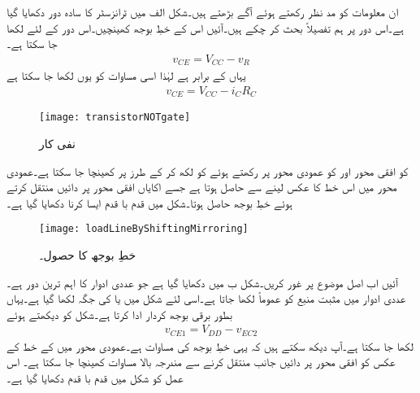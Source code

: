 ان معلومات کو مد نظر رکھتے ہوئے آگے بڑھتے ہیں۔شکل  الف میں ٹرانزسٹر کا سادہ دور دکھایا گیا ہے۔اس دور پر ہم تفصیلاً بحث کر چکے ہیں۔آئیں اس کے خطِ بوجھ کھینچیں۔اس دور کے لئے لکھا جا سکتا ہے۔
\begin{align*}
v_{CE}=V_{CC}-v_R
\end{align*}
یہاں  کے برابر ہے لہٰذا اسی مساوات کو یوں لکھا جا سکتا ہے
 \begin{align*}
v_{CE}=V_{CC}-i_C R_C
\end{align*}
%
\begin{figure}
\centering
\texttt{[image: transistorNOTgate]}
\caption{نفی کار}
\label{شکل_ٹرانزسٹر_نفی_کار}
\end{figure}
 کو افقی محور اور  کو عمودی محور پر رکھتے  ہوئے   کو  لکھ کر  کے طرز پر کھینچا جا سکتا ہے۔عمودی محور میں اس خط کا عکس لینے سے  حاصل ہوتا ہے جسے  اکایاں افقی محور پر دائیں منتقل کرتے ہوئے خطِ بوجھ  حاصل ہوتا۔شکل  میں قدم با قدم ایسا کرنا دکھایا گیا ہے۔
\begin{figure}
\centering
\texttt{[image: loadLineByShiftingMirroring]}
\caption{خطِ بوجھ کا حصول۔}
\label{شکل_ٹرانزسٹر_برقی_بار_کے_حصول_کا_دوسرا_طریقہ}
\end{figure}

آئیں اب اصل موضوع پر غور کریں۔شکل  ب میں   دکھایا گیا ہے جو عددی ادوار کا اہم ترین دور ہے۔عددی ادوار میں مثبت منبع کو  عموماً  لکھا جاتا ہے۔اسی لئے شکل میں  یا  کی جگہ  لکھا گیا ہے۔یہاں  بطور برقی بوجھ کردار ادا کرتا ہے۔شکل کو دیکھتے ہوئے
\begin{align*}
v_{CE1}=V_{DD}-v_{EC2}
\end{align*}
لکھا جا سکتا ہے۔آپ دیکھ سکتے ہیں کہ یہی  خطِ بوجھ  کی مساوات ہے۔عمودی محور میں  کے  خط کے عکس کو افقی محور پر دائیں جانب  منتقل کرنے سے مندرجہ بالا مساوات کھینچا جا سکتا ہے۔ اس عمل کو شکل  میں قدم با قدم دکھایا گیا ہے۔

